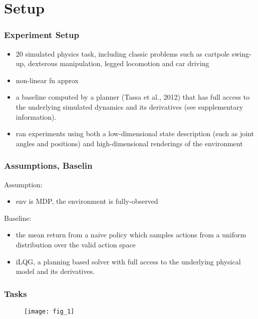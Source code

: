 \section{Setup}

\begin{frame}
\frametitle{Experiment Setup}

\begin{itemize}
  \item 20 simulated physics task,
  including classic problems such as cartpole swing-up, dexterous manipulation, legged locomotion and car driving
  \item non-linear fn approx
  \item a baseline computed by a planner (Tassa et al., 2012) that
  has full access to the underlying simulated dynamics and its derivatives (see supplementary information).
  \item ran experiments using both a low-dimensional state description (such as joint angles and positions) and high-dimensional renderings of the environment
\end{itemize}

\end{frame}


\begin{frame}
\frametitle{Assumptions, Baselin}

Assumption:
\begin{itemize}
  \item env is MDP, the environment is fully-observed
\end{itemize}


Baseline:
\begin{itemize}
  \item the mean return from a naive policy which samples actions from
  a uniform distribution over the valid action space
  \item iLQG, a planning based solver with full access to
  the underlying physical model and its derivatives.
\end{itemize}

\end{frame}

\begin{frame}
\frametitle{Tasks}
\begin{figure}
    \centering
    \texttt{[image: fig\_1]}
\end{figure}
\end{frame}
